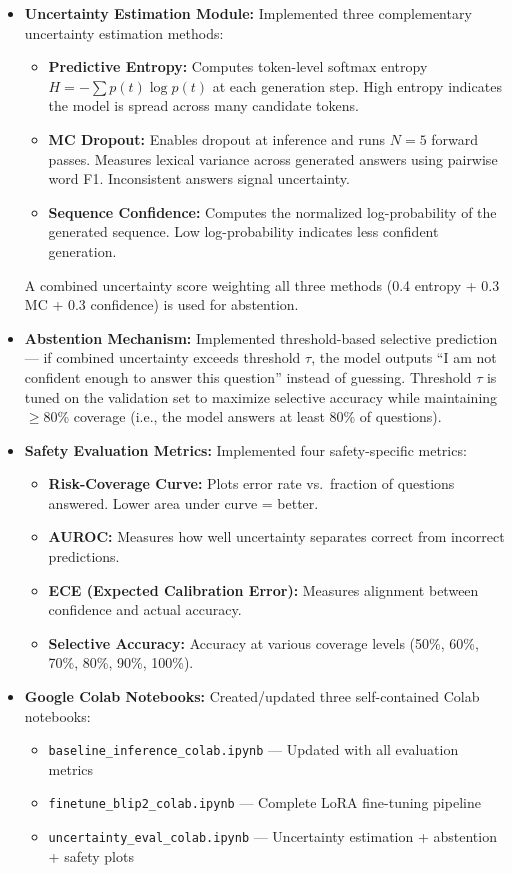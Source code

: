 \documentclass[12pt,a4paper]{article}
\begin{document}
\begin{itemize}[leftmargin=*]
    \item \textbf{Uncertainty Estimation Module:} Implemented three complementary uncertainty estimation methods:
    \begin{itemize}
        \item \textbf{Predictive Entropy:} Computes token-level softmax entropy $H = -\sum p(t) \log p(t)$ at each generation step. High entropy indicates the model is spread across many candidate tokens.
        \item \textbf{MC Dropout:} Enables dropout at inference and runs $N=5$ forward passes. Measures lexical variance across generated answers using pairwise word F1. Inconsistent answers signal uncertainty.
        \item \textbf{Sequence Confidence:} Computes the normalized log-probability of the generated sequence. Low log-probability indicates less confident generation.
    \end{itemize}
    A combined uncertainty score weighting all three methods (0.4 entropy + 0.3 MC + 0.3 confidence) is used for abstention.
    
    \item \textbf{Abstention Mechanism:} Implemented threshold-based selective prediction --- if combined uncertainty exceeds threshold $\tau$, the model outputs ``I am not confident enough to answer this question'' instead of guessing. Threshold $\tau$ is tuned on the validation set to maximize selective accuracy while maintaining $\geq$80\% coverage (i.e., the model answers at least 80\% of questions).
    
    \item \textbf{Safety Evaluation Metrics:} Implemented four safety-specific metrics:
    \begin{itemize}
        \item \textbf{Risk-Coverage Curve:} Plots error rate vs.\ fraction of questions answered. Lower area under curve = better.
        \item \textbf{AUROC:} Measures how well uncertainty separates correct from incorrect predictions.
        \item \textbf{ECE (Expected Calibration Error):} Measures alignment between confidence and actual accuracy.
        \item \textbf{Selective Accuracy:} Accuracy at various coverage levels (50\%, 60\%, 70\%, 80\%, 90\%, 100\%).
    \end{itemize}
    
    \item \textbf{Google Colab Notebooks:} Created/updated three self-contained Colab notebooks:
    \begin{itemize}
        \item \texttt{baseline\_inference\_colab.ipynb} --- Updated with all evaluation metrics
        \item \texttt{finetune\_blip2\_colab.ipynb} --- Complete LoRA fine-tuning pipeline
        \item \texttt{uncertainty\_eval\_colab.ipynb} --- Uncertainty estimation + abstention + safety plots
    \end{itemize}
\end{itemize}
\end{document}
